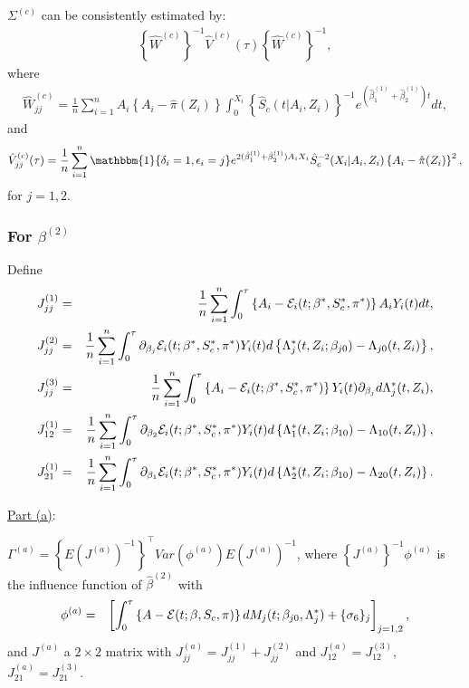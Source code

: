 \documentclass[11pt]{article}
\newcommand{\ee}{\end{eqnarray}}
\newcommand{\eqnn}{\begin{eqnarray*}}
\newcommand{\een}{\end{eqnarray*}}
\newcommand{\be}{\begin{eqnarray}}
\begin{document}
$\Sigma^{(c)}$
can be consistently estimated by: 
\be\label{score1v}
\left\{\hat{W}^{(c)}\right\}^{-1}\hat V^{(c)}(\tau)\left\{\hat{W}^{(c)}\right\}^{-1},
\ee
where
\eqnn
\hat{W}^{(c)}_{jj}=\frac{1}{n}\sum_{i=1}^nA_i\left\{A_i-\hat\pi(Z_i)\right\}\int_0^{X_i}\left\{\hat S_c(t | A_i,Z_i)\right\}^{-1}e^{(\hat\beta^{(1)}_1+\hat \beta^{(1)}_2)t}dt,
\een
and
\eqnn
\hat V^{(c)}_{jj}(\tau)=\frac{1}{n}\sum_{i=1}^n \mathbbm{1}\{\delta_i=1,\epsilon_i=j\}  e^{2(\hat\beta^{(1)}_1+\hat \beta^{(1)}_2)A_i X_i} \hat S^{-2}_c(X_i | A_i,Z_i)\left\{A_i-\hat\pi(Z_i)\right\}^2,
\een
for $j=1,2$.





\subsubsection{For $\beta^{(2)}$}

Define
\eqnn
J^{(1)}_{jj} &=& \frac{1}{n}\sum_{i=1}^n\int_0^\tau  \left\{A_i-{\cal E}_i(t; {\beta}^{*}, S^{*}_c,\pi^{*})\right\}A_iY_i(t)dt,\\
J^{(2)}_{jj} &=& \frac{1}{n}\sum_{i=1}^n\int_0^\tau  \partial_{\beta_j}{\cal E}_i(t; {\beta}^{*}, S^{*}_c,\pi^{*})Y_i(t)d\left\{\Lambda_j^{*}(t,Z_i ; \beta_{j0})-\Lambda_{j0}(t,Z_i)\right\},\\
J^{(3)}_{jj} &=& \frac{1}{n}\sum_{i=1}^n\int_0^\tau  \left\{A_i- {\cal E}_i(t; {\beta}^{*}, S^{*}_c,\pi^{*})\right\}Y_i(t)\partial_{\beta_j}d\Lambda^{*}_j(t,Z_i),\\
J^{(1)}_{12} &=& \frac{1}{n}\sum_{i=1}^n\int_0^\tau  \partial_{\beta_2}{\cal E}_i(t; {\beta}^{*}, S^{*}_c,\pi^{*})Y_i(t)d\left\{\Lambda_1^{*}(t,Z_i ; \beta_{10})-\Lambda_{10}(t,Z_i)\right\},\\
J^{(1)}_{21} &=& \frac{1}{n}\sum_{i=1}^n\int_0^\tau  \partial_{\beta_1}{\cal E}_i(t; {\beta}^{*}, S^{*}_c,\pi^{*})Y_i(t)d\left\{\Lambda_2^{*}(t,Z_i ; \beta_{10})-\Lambda_{20}(t,Z_i)\right\}.
\een

\underline{Part (a)}:

$\Gamma^{(a)}=\left\{{E}(J^{(a)})^{-1}\right\}^\top {Var}(\phi^{(a)}){E}(J^{(a)})^{-1}$, where
$\left\{J^{(a)}\right\}^{-1}\phi^{(a)}$ is the influence function of $\hat \beta^{(2)} $ with 
\eqnn
\phi^{(a)}&=&\left[\int_0^\tau \left\{A-{\cal E}(t; \beta, S_c,\pi)\right\}dM_{j}(t; \beta_{j0},\Lambda^{*}_j)+\{\sigma_{6}\}_j\right]_{j=1,2},
\een
and $J^{(a)}$  a $2\times2$ matrix with  $J^{(a)}_{jj}=J^{(1)}_{jj}+J^{(2)}_{jj}$ and $J^{(a)}_{12}=J^{(3)}_{12}$, $J^{(a)}_{21}=J^{(3)}_{21}$. 
\end{document}
